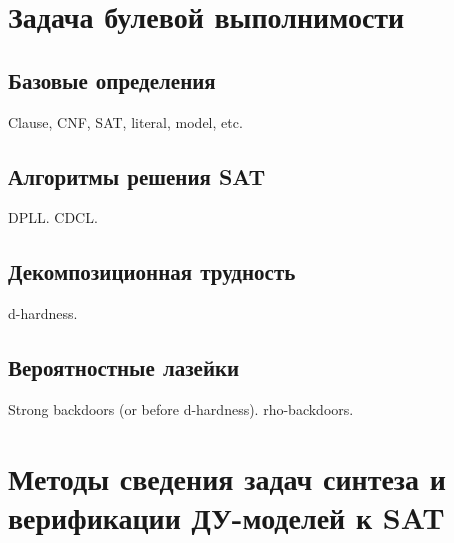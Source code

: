 \section{Задача булевой выполнимости}
\label{sec:sat}

\subsection{Базовые определения}
\label{sub:sat-definitions}

Clause, CNF, SAT, literal, model, etc.

\subsection{Алгоритмы решения SAT}
\label{sub:sat-algorithms}

DPLL. CDCL.

\subsection{Декомпозиционная трудность}
\label{sub:sat-decomposition}

d-hardness.

\subsection{Вероятностные лазейки}
\label{sub:sat-backdoors}

Strong backdoors (or before d-hardness).
rho-backdoors.

\section{Методы сведения задач синтеза и верификации ДУ-моделей к SAT}
\label{sec:sat-encodings}


\FloatBarrier

\clearpage







